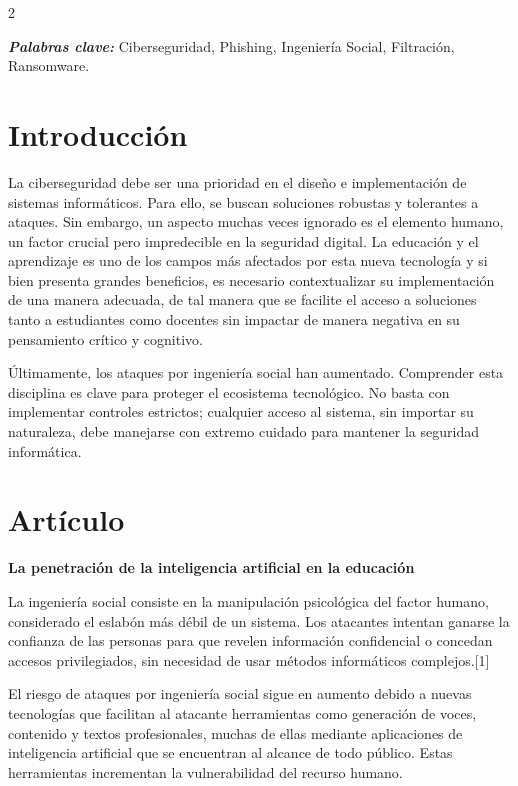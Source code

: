 \documentclass[12pt,spanish,Letterpaper,openany]{book}
\begin{document}
\begin {multicols}{2}

\textbf{\emph{Palabras clave:}} Ciberseguridad, Phishing, Ingeniería Social, Filtración, Ransomware.

\section{Introducción}\label{introducciuxf3n-13}

La ciberseguridad debe ser una prioridad en el diseño e implementación de sistemas informáticos. Para ello, se buscan soluciones robustas y tolerantes a ataques. Sin embargo, un aspecto muchas veces ignorado es el elemento humano, un factor crucial pero impredecible en la seguridad digital.
La educación y el aprendizaje es uno de los campos más afectados por esta nueva tecnología y si bien presenta grandes beneficios, es necesario contextualizar su implementación de una manera adecuada, de tal manera que se facilite el acceso a soluciones tanto a estudiantes como docentes sin impactar de manera negativa en su pensamiento crítico y cognitivo.

Últimamente, los ataques por ingeniería social han aumentado. Comprender esta disciplina es clave para proteger el ecosistema tecnológico. No basta con implementar controles estrictos; cualquier acceso al sistema, sin importar su naturaleza, debe manejarse con extremo cuidado para mantener la seguridad informática.

\section{Artículo}\label{artuxedculo-13}

\bigskip

\textbf{La penetración de la inteligencia artificial en la educación}

La ingeniería social consiste en la manipulación psicológica del factor humano, considerado el eslabón más débil de un sistema. Los atacantes intentan ganarse la confianza de las personas para que revelen información confidencial o concedan accesos privilegiados, sin necesidad de usar métodos informáticos complejos.{[}1{]}

El riesgo de ataques por ingeniería social sigue en aumento debido a nuevas tecnologías que facilitan al atacante herramientas como generación de voces, contenido y textos profesionales, muchas de ellas mediante aplicaciones de inteligencia artificial que se encuentran al alcance de todo público. Estas herramientas incrementan la vulnerabilidad del recurso humano.


\end{multicols}
\end{document}
